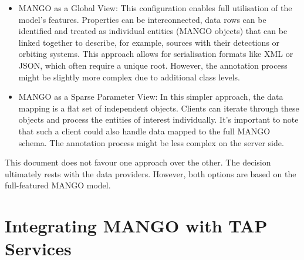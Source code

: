 \documentclass[11pt,a4paper]{ivoa}
\begin{document}
\begin{itemize}[noitemsep,topsep=0pt,parsep=0pt,partopsep=0pt]
    \item MANGO as a Global View: This configuration enables full utilisation of the 
          model's features. Properties can be interconnected, data rows can be identified
          and treated as individual entities (MANGO objects) that can be linked together to describe,
          for example, sources with their detections or orbiting systems.
          This approach allows for serialisation formats like XML or JSON, which often require
          a unique root.
          However, the annotation process might be slightly more complex due to additional class levels.
    \item MANGO as a Sparse Parameter View: In this simpler approach, the data mapping is a
          flat set of independent objects. Clients can iterate through these objects and process
          the entities of interest individually.
          It's important to note that such a client could also handle data mapped to the full MANGO schema.
          The annotation process might be less complex on the server side.
\end{itemize}

This document does not favour one approach over the other.
The decision ultimately rests with the data providers.
However, both options are based on the full-featured MANGO model.

%



\section{Integrating MANGO with TAP Services}


\pagebreak
\appendix

% 

% 

% 
\end{document}
